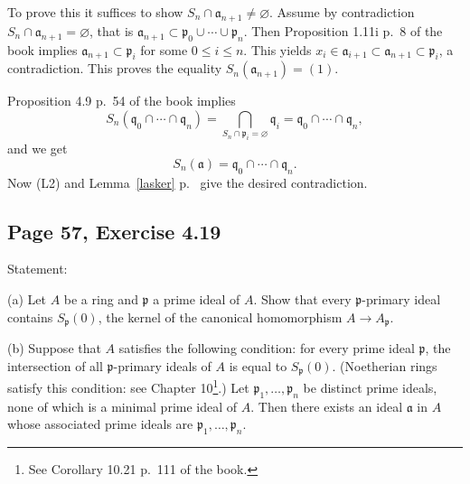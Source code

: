 \documentclass[parskip=half,fontsize=12pt]{scrartcl}%
\newcommand{\mf}{\mathfrak}
\newcommand{\aaa}{\mf a}
\newcommand{\bbb}{\mf b}
\newcommand{\ppp}{\mf p}
\newcommand{\qqq}{\mf q}
\begin{document}
To prove this it suffices to show $S_n\cap\aaa_{n+1}\ne\varnothing$. Assume by contradiction $S_n\cap\aaa_{n+1}=\varnothing$, that is $\aaa_{n+1}\subset\ppp_0\cup\cdots\cup\ppp_n$. Then Proposition 1.11i p.~8 of the book implies $\aaa_{n+1}\subset\ppp_i$ for some $0\le i\le n$. This yields $x_i\in\aaa_{i+1}\subset\aaa_{n+1}\subset\ppp_i$, a contradiction. This proves the equality $S_n(\aaa_{n+1})=(1)$.

Proposition 4.9 p.~54 of the book implies 
$$
S_n(\qqq_0\cap\cdots\cap\qqq_n)=\bigcap_{S_n\cap\ppp_i=\varnothing}\qqq_i=\qqq_0\cap\cdots\cap\qqq_n,
$$ 
and we get
$$
S_n(\aaa)=\qqq_0\cap\cdots\cap\qqq_n.
$$ 
Now (L2) and Lemma~\ref{lasker} p.~\pageref{lasker} give the desired contradiction.

\subsection{Page 57, Exercise 4.19}%

Statement:

(a) Let $A$ be a ring and $\mathfrak p$ a prime ideal of $A$. Show that every $\mathfrak p$-primary ideal contains $S_{\mathfrak p}(0)$, the kernel of the canonical homomorphism $A\to A_{\mathfrak p}$.

(b) Suppose that $A$ satisfies the following condition: for every prime ideal $\mathfrak p$, the intersection of all $\mathfrak p$-primary ideals of $A$ is equal to $S_{\mathfrak p}(0)$. (Noetherian rings satisfy this condition: see Chapter 10\footnote{See Corollary 10.21 p.~111 of the book.}.) Let $\mathfrak p_1,\dots,\mathfrak p_n$ be distinct prime ideals, none of which is a minimal prime ideal of $A$. Then there exists an ideal $\mathfrak a$ in $A$ whose associated prime ideals are $\mathfrak p_1,\dots,\mathfrak p_n$.
\end{document}
